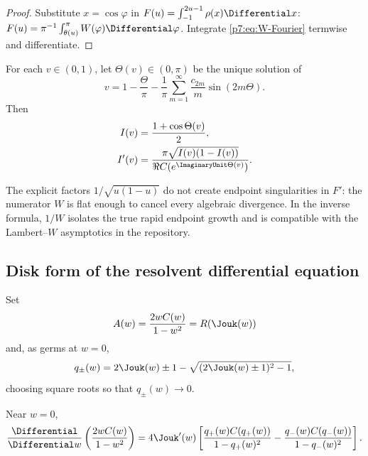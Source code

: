 \documentclass[11pt]{article}
\theoremstyle{definition}
\theoremstyle{remark}
\begin{document}
\begin{proof}
Substitute \(x=\cos\varphi\) in \(F(u)=\int_{-1}^{2u-1}\rho(x)\Differential x\):
\(F(u)=\pi^{-1}\int_{\theta(u)}^\pi W(\varphi)\Differential\varphi\). Integrate
\eqref{p7:eq:W-Fourier} termwise and differentiate.
\end{proof}

\begin{corollary}
\label{p7:cor:inverse-phase}
For each \(v\in(0,1)\), let \(\Theta(v)\in(0,\pi)\) be the unique solution of
\begin{equation}
 v=1-\frac{\Theta}{\pi}
 -\frac1\pi\sum_{m=1}^{\infty}\frac{c_{2m}}{m}\sin(2m\Theta).
 \label{p7:eq:Theta-implicit}
\end{equation}
Then
\begin{align}
 I(v)&=\frac{1+\cos\Theta(v)}{2},
 \label{p7:eq:I-phase}\\
 I'(v)&=\frac{\pi\sqrt{I(v)(1-I(v))}}{\Re C(e^{\ImaginaryUnit\Theta(v)})}.
 \label{p7:eq:Iprime-C}
\end{align}
\end{corollary}

The explicit factors \(1/\sqrt{u(1-u)}\) do not create endpoint singularities in \(F'\): the
numerator \(W\) is flat enough to cancel every algebraic divergence. In the inverse formula,
\(1/W\) isolates the true rapid endpoint growth and is compatible with the Lambert--\(W\)
asymptotics in the repository.

\subsection{Disk form of the resolvent differential equation}

Set
\begin{equation}
 A(w)=\frac{2wC(w)}{1-w^2}=R(\Jouk(w))
 \label{p7:eq:A-disk}
\end{equation}
and, as germs at \(w=0\),
\begin{equation}
 q_{\pm}(w)=2\Jouk(w)\pm1-
 \sqrt{(2\Jouk(w)\pm1)^2-1},
 \label{p7:eq:qpm}
\end{equation}
choosing square roots so that \(q_\pm(w)\to0\).

\begin{proposition}
\label{p7:prop:disk-composition}
Near \(w=0\),
\begin{equation}
 \frac{\Differential}{\Differential w}\left(\frac{2wC(w)}{1-w^2}\right)
 =4\Jouk'(w)\left[
 \frac{q_+(w)C(q_+(w))}{1-q_+(w)^2}
 -\frac{q_-(w)C(q_-(w))}{1-q_-(w)^2}
 \right].
 \label{p7:eq:disk-composition}
\end{equation}
\end{proposition}
\end{document}
